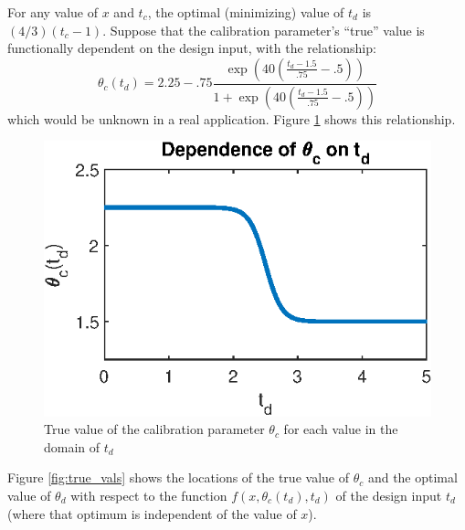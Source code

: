\documentclass[10pt]{asme2ej}
\begin{document}
%
For any value of $x$ and $t_c$, the optimal (minimizing) value of $t_d$ is $(4/3)(t_c-1)$.
%
Suppose that the calibration parameter's ``true'' value is functionally dependent on the design input, with the relationship:
%
\begin{equation}
	\theta_c(t_d)= 2.25 - .75 \frac{ \exp\left(40\left(\frac{t_d-1.5}{.75}-.5\right)\right)} {1 + \exp\left( 40\left(\frac{t_d-1.5}{.75}-.5\right) \right)}
\end{equation}
%
which would be unknown in a real application.
%
Figure \ref{fig:SA_relationship} shows this relationship.
%
\begin{figure}
	\centering
	\includegraphics[scale=0.85]{figures/figure_2}
	\captionsetup{width=.85\linewidth}
	\caption{True value of the calibration parameter $\theta_c$ for each value in the domain of $t_d$}
	\label{fig:SA_relationship}
\end{figure}
%
Figure \ref{fig:true_vals} shows the locations of the true value of $\theta_c$ and the optimal value of $\theta_d$ with respect to the function $f(x,\theta_c(t_d),t_d)$ of the design input $t_d$ (where that optimum is independent of the value of $x$).
%
\end{document}
